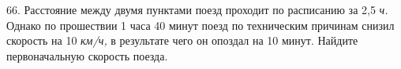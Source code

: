 66. Расстояние между двумя пунктами поезд проходит по расписанию за 2,5 {\it ч.} Однако по прошествии 1 часа 40 минут поезд по техническим причинам снизил скорость на 10 {\it км/ч,} в результате чего он опоздал на 10 минут. Найдите первоначальную скорость поезда.\\
